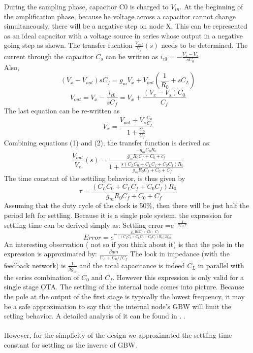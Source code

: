\documentclass{article}
\begin{document}
During the sampling phase, capacitor C0 is charged to $V_{in}$. At the beginning of the amplification phase, because he voltage across a capacitor cannot change simultaneously, there will be a negative step on node X. This can be represented as an ideal capacitor with a voltage source in series whose output in a negative going step as shown. The transfer fucntion $\frac{V_{out}}{V_s}(s)$ needs to be determined.
The current through the capacitor $C_o$ can be written as $i_{c0}=-\frac{V_x-V_s}{sC_0}$ \\
Also, 
	\begin{equation}
		(V_x-V_{out})sC_f = g_mV_x + V_{out}(\frac{1}{R_0} +sC_L) 
	\end{equation}
	\begin{equation*}
		V_{out}=V_x-\frac{i_{c0}}{sC_f}=V_x+\frac{(V_x-V_s)C_0}{C_f}
	\end{equation*}
The last equation can be re-written as
	\begin{equation}
		V_x=\frac{V_{out}+V_s\frac{C_0}{C_f}}{1+\frac{C_0}{C_f}}
	\end{equation}
Combining equations (1) and (2), the transfer function is derived as:
	\begin{equation}
		\frac{V_{out}}{V_s}(s) = \frac{\frac{-g_mC_0R_0}{g_mR_0C_f + C_0 +c_f}}{1+\frac{s(C_LC_0+C_LC_f+C_0C_f)R_0}{g_mR_0C_f + C_0 + C_f}}
	\end{equation}
The time constant of the settiling behavior, is thus given by
	\begin{equation}
		\tau=\frac{(C_LC_0+C_LC_f+C_0C_f)R_0}{g_mR_0C_f + C_0 + C_f}
	\end{equation}
Assuming that the duty cycle of the clock is 50\%, then there will be just half the period left for settling. Because it is a single pole system, the exprsssion for settling time can be derived simply as: 
Settling error =$ e^ {-\frac{1}{2f_{clk}\tau}}$
	\begin{equation}
	Error = e^ {-\frac{g_mR_0C_f + C_0 + C_f}{[(C_LC_0+C_LC_f+C_0C_f)R_0]2f_{clk}}}
	\end{equation}
An interesting observation ( not so if you think about it) is that the pole in the expression is approximated by: $ \frac{\beta gm}{C_L + C_0//C_f} $
The look in impedance (with the feedback network) is $\frac{1}{\beta g_m}$ and the total capacitance is indeed $C_L$ in parallel with the series combination of $C_0$ and $C_f$. 
However this expression is only valid for a single stage OTA. The settling of the internal node comes into picture. Because the pole at the output of the first stage is typically the lowest frequency, it may be a safe approximation to say that the internal node's GBW will limit the setling behavior. A detailed analysis of it can be found in \cite{4663680}. . \\ \\
However, for the simplicity of the design we approximated the settling time constant for settling as the inverse of GBW.
\end{document}
